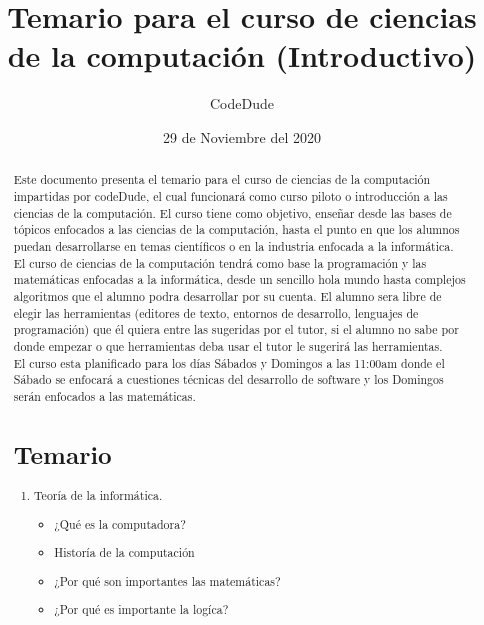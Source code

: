 \documentclass[12pt, letterpaper]{article}
\author{CodeDude}
\title{Temario para el curso de ciencias de la computación (Introductivo)}
\date{29 de Noviembre del 2020}
\begin{document}
\maketitle
\newpage
\begin{abstract}
Este documento presenta el temario para el curso de ciencias de la computación impartidas por codeDude, el cual funcionará como curso piloto o introducción
a las ciencias de la computación.
El curso tiene como objetivo, enseñar desde las bases de tópicos enfocados a las ciencias de la computación, hasta el punto en 
que los alumnos puedan desarrollarse en temas científicos
o en la industria enfocada a la informática.\\
El curso de ciencias de la computación tendrá como base la programación y las matemáticas enfocadas a la informática, desde un sencillo hola mundo
hasta complejos algoritmos que el alumno podra desarrollar por su cuenta. El alumno sera libre de elegir las herramientas (editores de texto, entornos de
desarrollo, lenguajes de programación) que él quiera entre las sugeridas por el tutor, si el alumno no sabe por donde empezar o que herramientas deba usar
el tutor le sugerirá las herramientas.\\
El curso esta planificado para los días Sábados y Domingos a las 11:00am donde el Sábado se enfocará a cuestiones técnicas del desarrollo de software y los
Domingos serán enfocados a las matemáticas.
\newpage
\section{Temario}
\begin{enumerate}
  \item Teoría de la informática.
    \begin{itemize}
      \item ¿Qué es la computadora?	
      \item Historía de la computación
      \item ¿Por qué son importantes las matemáticas?
      \item ¿Por qué es importante la logíca?
    \end{itemize} 
\end{enumerate}
\end{abstract}
\end{document}
